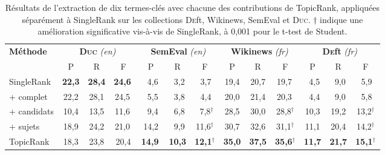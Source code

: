         \begin{table}
          \centering
          \begin{tabular}{l|c@{~~}c@{~~}c@{~}|c@{~~}c@{~~}c@{~}|c@{~~}c@{~~}c@{~}|c@{~~}c@{~~}c@{~}}
            \toprule
            \multirow{2}{*}[-2pt]{\textbf{Méthode}} & \multicolumn{3}{c|}{\textbf{\textsc{Duc}} \textit{(en)}} & \multicolumn{3}{c|}{\textbf{SemEval} \textit{(en)}} & \multicolumn{3}{c|}{\textbf{Wikinews} \textit{(fr)}} & \multicolumn{3}{c}{\textbf{\textsc{De}ft} \textit{(fr)}}\\
            \cline{2-4}\cline{5-7}\cline{8-10}\cline{11-13}
            & P & R & F & P & R & F & P & R & F & P & R & F\\
            \hline
            SingleRank & \textbf{22,3} & \textbf{28,4} & \textbf{24,6}$^{~}$ & $~~$4,6 & $~~$3,2 & $~~$3,7$^{~}$ & 19,4 & 20,7 & 19,7$^{~}$ & $~~$4,5 & $~~$9,0 & $~~$5,9$^{~}$\\
            + complet & 22,2 & 28,1 & 24,5$^{~}$ & $~~$5,5 & $~~$3,8 & $~~$4,4$^{~}$ & 20,0 & 21,4 & 20,3${~}$ & $~~$4,4 & $~~$9,0 & $~~$5,8$^{~}$\\
            + candidats & 10,4 & 13,5 & 11,6$^{~}$ & $~~$9,4 & $~~$6,8 & $~~$7,8$^\dagger$ & 28,5 & 30,0 & 28,8$^\dagger$ & 10,3 & 19,2 & 13,2$^\dagger$\\
            + sujets & 18,9 & 24,2 & 21,0$^{~}$ & 14,2 & $~~$9,9 & 11,6$^\dagger$ & 30,7 & 32,6 & 31,1$^\dagger$ & 11,1 & 20,4 & 14,2$^\dagger$\\
            TopicRank & 18,3 & 23,8 & 20,4 & \textbf{14,9}$^{~}$ & \textbf{10,3} & \textbf{12,1}$^\dagger$ & \textbf{35,0} & \textbf{37,5} & \textbf{35,6}$^\dagger$ & \textbf{11,7} & \textbf{21,7} & \textbf{15,1}$^\dagger$\\
            \bottomrule
          \end{tabular}
          \caption[Résultats de l'extraction de dix termes-clés avec chacune des
                   contributions de TopicRank, appliquées séparément à
                   SingleRank sur les collections \textsc{De}ft, Wikinews,
                   SemEval et \textsc{Duc}]{
            Résultats de l'extraction de dix termes-clés avec chacune des
            contributions de TopicRank, appliquées séparément à SingleRank sur
            les collections \textsc{De}ft, Wikinews, SemEval et \textsc{Duc}.
            $\dagger$ indique une amélioration significative vis-à-vis de
            SingleRank, à 0,001 pour le t-test de Student.
            \label{tab:evaluation_individuelle_des_ameliorations}
          }
        \end{table}

